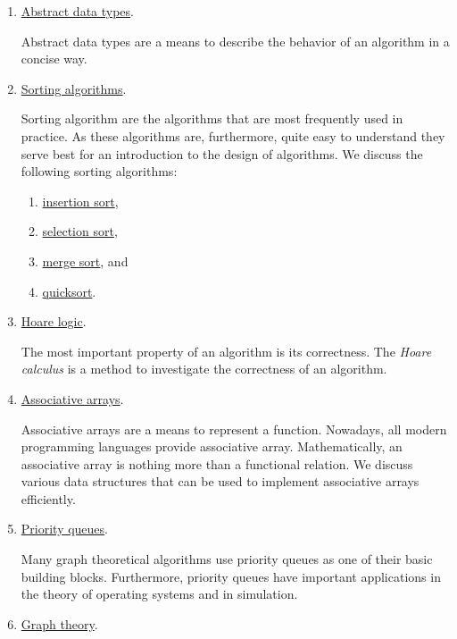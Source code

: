 \begin{enumerate}
\item \href{http://en.wikipedia.org/wiki/Abstract_data_types}{Abstract data types}.

      Abstract data types are a means to describe the behavior of an algorithm in a concise way.
\item \href{http://en.wikipedia.org/wiki/Sorting_algorithm}{Sorting algorithms}.

      Sorting algorithm are the algorithms that are most frequently used in practice.  As these
      algorithms are, furthermore, quite easy to understand they serve best for an introduction to
      the design of algorithms.  We discuss the following sorting algorithms:
      \begin{enumerate}
      \item \href{http://en.wikipedia.org/wiki/Insertion_sort}{insertion sort},
      \item \href{http://en.wikipedia.org/wiki/Selection_sort}{selection sort},
      \item \href{http://en.wikipedia.org/wiki/Merge_sort}{merge sort}, and
      \item \href{http://en.wikipedia.org/wiki/Quicksort}{quicksort}.
      \end{enumerate}
\item \href{http://en.wikipedia.org/wiki/Hoare_logic}{Hoare logic}.
  
      The most important property of an algorithm is its correctness.  The \emph{Hoare calculus}
      is a method to investigate the correctness of an algorithm.  

\item \href{http://en.wikipedia.org/wiki/Map_(computer_science)}{Associative arrays}.
  
      Associative arrays are a means to represent a function.  Nowadays, all modern programming
      languages provide associative array.  
      Mathematically, an associative array is nothing more than a functional relation.  
      We discuss various data structures that can be used to implement associative arrays efficiently.
\item \href{http://en.wikipedia.org/wiki/Priority_queue}{Priority queues}.
  
      Many graph theoretical algorithms use priority queues as one of their basic building blocks.
      Furthermore, priority queues have important applications in the theory of operating systems
      and in simulation.
\item \href{http://en.wikipedia.org/wiki/Graph_theory}{Graph theory}.
  

\end{enumerate}
